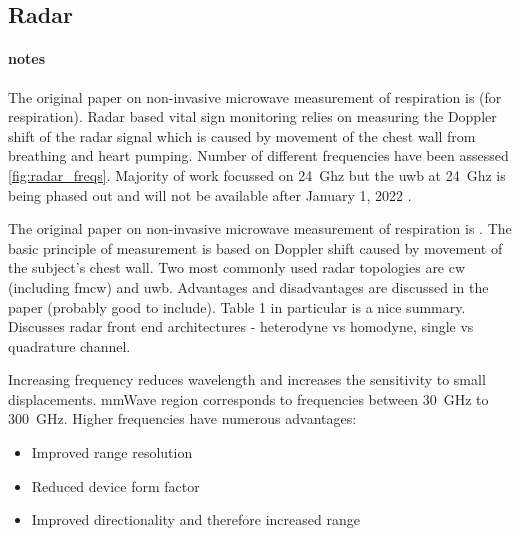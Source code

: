 \documentclass[11pt, parskip=half*,twoside=false]{scrbook}
\begin{document}

\subsection{Radar}
\paragraph{notes}
The original paper on non-invasive microwave measurement of respiration is  \citep{linNoninvasiveMicrowaveMeasurement1975} (for respiration).  Radar based vital sign monitoring relies on measuring the Doppler shift of the radar signal which is caused by movement of the chest wall from breathing and heart pumping. Number of different frequencies have been assessed \cref{fig:radar_freqs}. Majority of work focussed on 24~Ghz but the \gls{uwb} at 24~Ghz is being phased out and will not be available after January 1, 2022 \citep{ramasubramanianMovingLegacy242018}. 

The original paper on non-invasive microwave measurement of respiration is  \citep{linNoninvasiveMicrowaveMeasurement1975}. The basic principle of measurement is based on Doppler shift caused by movement of the subject's chest wall.  Two most commonly used radar topologies are \gls{cw} (including \gls{fmcw}) and \gls{uwb}. Advantages and disadvantages are discussed in the paper (probably good to include). Table 1 in particular is a nice summary. Discusses radar front end architectures - heterodyne vs homodyne, single vs quadrature channel.

Increasing frequency reduces wavelength and increases the sensitivity to small displacements. mmWave region corresponds to frequencies between 30~GHz to 300~GHz.  Higher frequencies have numerous advantages:
\begin{itemize}
	\item Improved range resolution
	\item Reduced device form factor
	\item Improved directionality and therefore increased range
\end{itemize}
\end{document}
